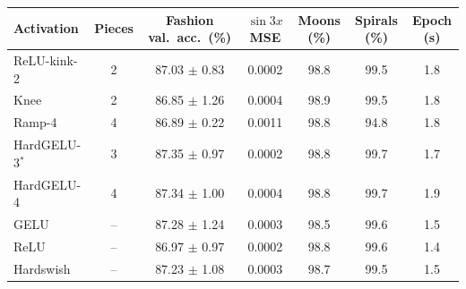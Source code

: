\begin{tabular}{lcccccc}
\toprule
Activation & Pieces & Fashion val.\ acc.\ (\%) & $\sin 3x$ MSE & Moons (\%) & Spirals (\%) & Epoch (s) \\
\midrule
ReLU-kink-2 & 2 & 87.03 $\pm$ 0.83 & 0.0002 & 98.8 & 99.5 & 1.8 \\
Knee & 2 & 86.85 $\pm$ 1.26 & 0.0004 & 98.9 & 99.5 & 1.8 \\
Ramp-4 & 4 & 86.89 $\pm$ 0.22 & 0.0011 & 98.8 & 94.8 & 1.8 \\
HardGELU-3$^\ast$ & 3 & 87.35 $\pm$ 0.97 & 0.0002 & 98.8 & 99.7 & 1.7 \\
HardGELU-4 & 4 & 87.34 $\pm$ 1.00 & 0.0004 & 98.8 & 99.7 & 1.9 \\
\midrule
GELU & -- & 87.28 $\pm$ 1.24 & 0.0003 & 98.5 & 99.6 & 1.5 \\
ReLU & -- & 86.97 $\pm$ 0.97 & 0.0002 & 98.8 & 99.6 & 1.4 \\
Hardswish & -- & 87.23 $\pm$ 1.08 & 0.0003 & 98.7 & 99.5 & 1.5 \\
\bottomrule
\end{tabular}

